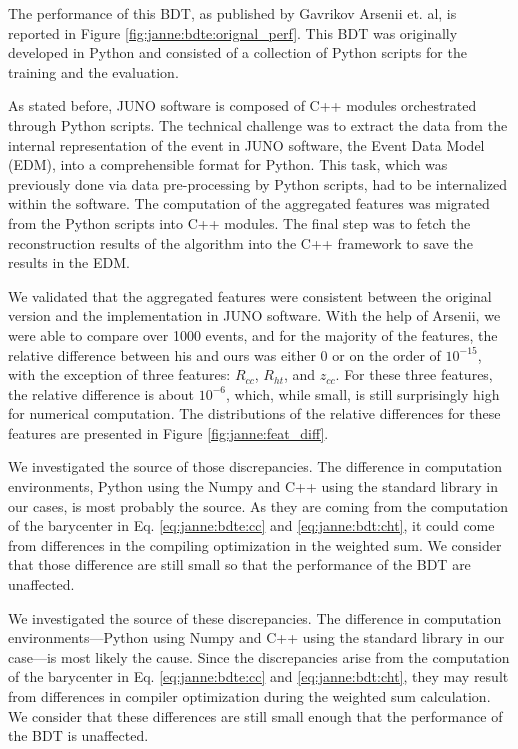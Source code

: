 \documentclass[../main.tex]{subfiles}
\begin{document}
The performance of this BDT, as published by Gavrikov Arsenii et. al, is reported in Figure \ref{fig:janne:bdte:orignal_perf}. This BDT was originally developed in Python and consisted of a collection of Python scripts for the training and the evaluation.

As stated before, JUNO software is composed of C++ modules orchestrated through Python scripts. The technical challenge was to extract the data from the internal representation of the event in JUNO software, the Event Data Model (EDM), into a comprehensible format for Python. This task, which was previously done via data pre-processing by Python scripts, had to be internalized within the software. The computation of the aggregated features was migrated from the Python scripts into C++ modules. The final step was to fetch the reconstruction results of the algorithm into the C++ framework to save the results in the EDM.

We validated that the aggregated features were consistent between the original version and the implementation in JUNO software. With the help of Arsenii, we were able to compare over 1000 events, and for the majority of the features, the relative difference between his and ours was either 0 or on the order of $10^{-15}$, with the exception of three features: $R_{cc}$, $R_{ht}$, and $z_{cc}$. For these three features, the relative difference is about $10^{-6}$, which, while small, is still surprisingly high for numerical computation. The distributions of the relative differences for these features are presented in Figure \ref{fig:janne:feat_diff}.

We investigated the source of those discrepancies. The difference in computation environments, Python using the Numpy \cite{harris_array_2020} and C++ using the standard library in our cases, is most probably the source. As they are coming from the computation of the barycenter in Eq. \ref{eq:janne:bdte:cc} and \ref{eq:janne:bdt:cht}, it could come from differences in the compiling optimization in the weighted sum. We consider that those difference are still small so that the performance of the BDT are unaffected.

We investigated the source of these discrepancies. The difference in computation environments—Python using Numpy \cite{harris_array_2020} and C++ using the standard library in our case—is most likely the cause. Since the discrepancies arise from the computation of the barycenter in Eq. \ref{eq:janne:bdte:cc} and \ref{eq:janne:bdt:cht}, they may result from differences in compiler optimization during the weighted sum calculation. We consider that these differences are still small enough that the performance of the BDT is unaffected.
\end{document}

